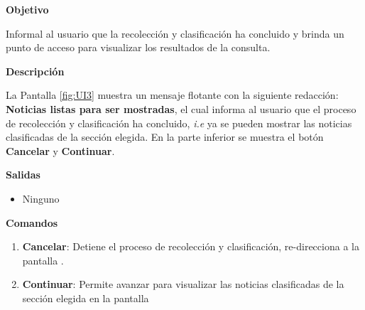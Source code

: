 \begin{large}
  \textbf{Objetivo}\\
\end{large}


Informal al usuario que la recolección y clasificación ha concluido y brinda un punto de acceso para visualizar los resultados de la consulta.\\

\begin{large}
  \textbf{Descripción}\\
\end{large}

La Pantalla \ref{fig:UI3} muestra un mensaje flotante con la siguiente redacción: \textbf{Noticias listas para ser mostradas}, el cual informa al usuario que el proceso de recolección y clasificación ha concluido, \textit{i.e} ya se pueden mostrar las noticias clasificadas de la sección elegida. En la parte inferior se muestra el botón \textbf{Cancelar} y \textbf{Continuar}.  \\

\begin{large}
  \textbf{Salidas}
\end{large}

\begin{itemize}

  \item Ninguno

\end{itemize}


\textbf{Comandos}

\begin{enumerate}

  \item \textbf{Cancelar}: Detiene el proceso de recolección y clasificación, re-direcciona a la pantalla .
  \item \textbf{Continuar}: Permite avanzar para visualizar las noticias clasificadas de la sección elegida en la pantalla 

\end{enumerate}

